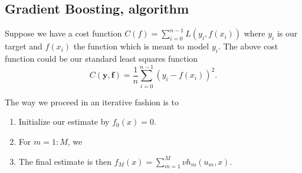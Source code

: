 \documentclass[%
oneside,                 %
final,                   %
10pt]{article}
\begin{document}
\subsection*{Gradient Boosting, algorithm}

Suppose we have a cost function $C(f)=\sum_{i=0}^{n-1}L(y_i, f(x_i))$ where $y_i$ is our target and $f(x_i)$ the function which is meant to model $y_i$. The above cost function could be our standard least squares  function
\[
C(\bm{y},\bm{f})=\frac{1}{n}\sum_{i=0}^{n-1}(y_i-f(x_i))^2.
\]

The way we proceed in an iterative fashion is to
\begin{enumerate}
\item Initialize our estimate by $f_0(x)=0$.

\item For $m=1:M$, we

\noindent
\item The final estimate is then $f_M(x) = \sum_{m=1}^M\nu h_m(u_m,x)$.
\end{enumerate}

\noindent
\end{document}

